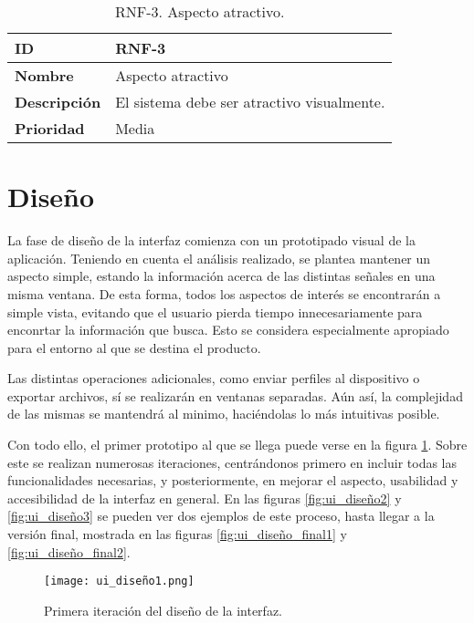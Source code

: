 \begin{table}[h!]
    \centering
    \begin{tabular}{|m{2.5cm}|m{9.27cm}|}
        \hline
        \textbf{ID} & RNF-3 \\
        \hline
        \textbf{Nombre} & Aspecto atractivo \\
        \hline
        \textbf{Descripción} & El sistema debe ser atractivo visualmente. \\
        \hline
        \textbf{Prioridad} & Media \\
        \hline
    \end{tabular}
    \caption{RNF-3. Aspecto atractivo.}
\end{table}

\section{Diseño}
\label{sec:ui_diseño}

La fase de diseño de la interfaz comienza con un prototipado visual de la aplicación. Teniendo en cuenta el análisis realizado, se plantea mantener un aspecto simple, estando la información acerca de las distintas señales en una misma ventana. De esta forma, todos los aspectos de interés se encontrarán a simple vista, evitando que el usuario pierda tiempo innecesariamente para enconrtar la información que busca. Esto se considera especialmente apropiado para el entorno al que se destina el producto.

Las distintas operaciones adicionales, como enviar perfiles al dispositivo o exportar archivos, sí se realizarán en ventanas separadas. Aún así, la complejidad de las mismas se mantendrá al minimo, haciéndolas lo más intuitivas posible.

Con todo ello, el primer prototipo al que se llega puede verse en la figura \ref{fig:ui_diseño1}. Sobre este se realizan numerosas iteraciones, centrándonos primero en incluir todas las funcionalidades necesarias, y posteriormente, en mejorar el aspecto, usabilidad y accesibilidad de la interfaz en general. En las figuras \ref{fig:ui_diseño2} y \ref{fig:ui_diseño3} se pueden ver dos ejemplos de este proceso, hasta llegar a la versión final, mostrada en las figuras \ref{fig:ui_diseño_final1} y \ref{fig:ui_diseño_final2}.

\begin{figure}[h!]
    \centering
    \texttt{[image: ui\_diseño1.png]}
    \caption{Primera iteración del diseño de la interfaz.}
    \label{fig:ui_diseño1}
\end{figure}


